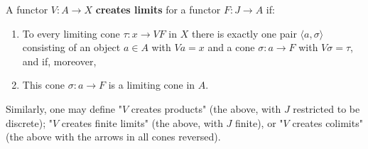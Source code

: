 A functor $V : A \to X$ \textbf{creates limits} for a functor $F : J \to A$ if:
\begin{enumerate}
\item[(i)] To every limiting cone $\tau : x \to VF$ in $X$ there is exactly one pair $\langle a, \sigma \rangle$ consisting of an object $a \in A$ with $Va = x$ and a cone $\sigma : a \to F$ with $V\sigma = \tau$, and if, moreover,
\item[(ii)] This cone $\sigma : a \to F$ is a limiting cone in $A$.
\end{enumerate}
Similarly, one may define "$V$ creates products" (the above, with $J$ restricted to be discrete); "$V$ creates finite limits" (the above, with $J$ finite), or "$V$ creates colimits" (the above with the arrows in all cones reversed).
